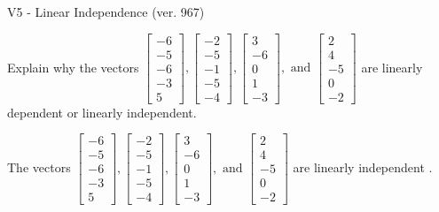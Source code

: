 \begin{exercise}
  \begin{exerciseTitle}V5 - Linear Independence (ver. 967)\end{exerciseTitle}
  \begin{exerciseStatement}
    Explain why the vectors \(\left[\begin{array}{r}
-6 \\
-5 \\
-6 \\
-3 \\
5
\end{array}\right] , \left[\begin{array}{r}
-2 \\
-5 \\
-1 \\
-5 \\
-4
\end{array}\right] , \left[\begin{array}{r}
3 \\
-6 \\
0 \\
1 \\
-3
\end{array}\right] , \text{ and } \left[\begin{array}{r}
2 \\
4 \\
-5 \\
0 \\
-2
\end{array}\right]\) are linearly dependent or linearly independent.	


  \end{exerciseStatement}
  \begin{exerciseAnswer}
   The vectors \(\left[\begin{array}{r}
-6 \\
-5 \\
-6 \\
-3 \\
5
\end{array}\right] , \left[\begin{array}{r}
-2 \\
-5 \\
-1 \\
-5 \\
-4
\end{array}\right] , \left[\begin{array}{r}
3 \\
-6 \\
0 \\
1 \\
-3
\end{array}\right] , \text{ and } \left[\begin{array}{r}
2 \\
4 \\
-5 \\
0 \\
-2
\end{array}\right]\) are 
  	 linearly independent  .
  


  \end{exerciseAnswer}
\end{exercise}